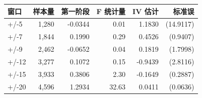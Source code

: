 \begin{tabular}{lrrrrr}
\toprule
窗口 & 样本量 & 第一阶段 & F 统计量 & IV 估计 & 标准误 \\
\midrule
+/-5 & 1,280 & -0.0344 & 0.01 & 1.1830 & (14.9117) \\
+/-7 & 1,844 & 0.1990 & 0.29 & 0.4526 & (0.9407) \\
+/-9 & 2,462 & -0.0652 & 0.04 & 0.1819 & (1.7998) \\
+/-12 & 3,277 & 0.1072 & 0.15 & -0.9439 & (2.8116) \\
+/-15 & 3,933 & 0.3806 & 2.30 & -0.1649 & (0.2887) \\
+/-20 & 4,596 & 1.2934 & 32.63 & 0.0411 & (0.0636) \\
\bottomrule
\end{tabular}
